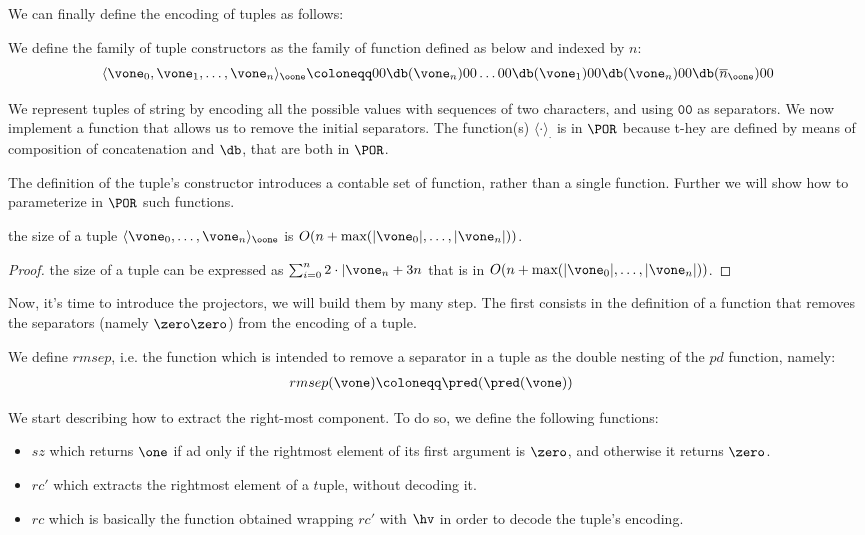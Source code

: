 We can finally define the encoding of tuples as follows:

\begin{defn}
We define the family of tuple constructors as the family of function defined as below and indexed by $n$:
\[
\langle \vone_0, \vone_1, \ldots, \vone_n\rangle_\oone \coloneqq 00 \db (\vone_n) 00 \ldots 00 \db (\vone_1) 00  \db(\vone_n) 00 \db(\overline n_\oone) 00
\]
\end{defn}

We represent tuples of string by encoding all the possible values with sequences of two characters, and using $\mathtt{00}$ as separators. We now implement a function that allows us to remove the initial separators. The function(s) $\langle \cdot \rangle _\cdot$ is in $\POR$ because t-hey are defined by means of composition of concatenation and $\db$, that are both in $\POR$.

The definition of the tuple's constructor introduces a contable set of function, rather than a single function. Further we will show how to parameterize in $\POR$ such functions.

\begin{remark}
\label{remark:tsize}
the size of a tuple $\langle \vone_0, \ldots,\vone_n\rangle_\oone$ is $O(n+ \text{max}(|\vone_0|, \ldots, |\vone_n|))$.
\end{remark}
\begin{proof}
the size of a tuple can be expressed as $\sum_{i=0}^n 2 \cdot {|\vone_n}+ 3n$ that is in $O(n+ \text{max}(|\vone_0|, \ldots, |\vone_n|))$.
\end{proof}

Now, it's time to introduce the projectors, we will build them by many step. The first consists in the definition of a function that removes the separators (namely $\zero\zero$) from the encoding of a tuple.

\begin{defn}
We define $rmsep$, i.e. the function which is intended to remove a separator in a tuple as the double nesting of the $pd$ function, namely:
\begin{align*}
rmsep(\vone) &\coloneqq \pred(\pred(\vone))
\end{align*}
\end{defn}

We start describing how to extract the right-most component. To do so, we define the following functions:
\begin{itemize}
\item $sz$ which returns $\one$ if ad only if the rightmost element of its first argument is $\zero$, and otherwise it returns $\zero$.
\item $rc'$ which extracts the rightmost element of a $t$uple, without decoding it.
\item $rc$ which is basically the function obtained wrapping $rc'$ with $\hv$ in order to decode the tuple's encoding.
\end{itemize}

